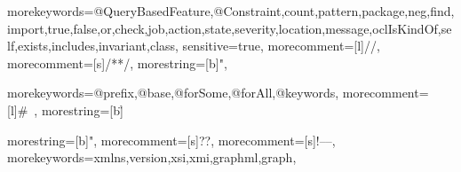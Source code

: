 
{
	morekeywords={@QueryBasedFeature,@Constraint,count,pattern,package,neg,find,import,true,false,or,check,job,action,state,severity,location,message,oclIsKindOf,self,exists,includes,invariant,class},
	sensitive=true,
	morecomment=[l]{//},
	morecomment=[s]{/*}{*/},
	morestring=[b]{"},
}




\newcommand{\listingiqpl}[2]
{
	\lstset{
		language=iqpl
	}
	
}

\newcommand{\listingjava}[2]{
	\lstset{
		language=Java
	}
	
}

\newcommand{\listingsparql}[2]{
	\lstset{
		language=sparql
	}
	
}

{
	morekeywords={@prefix,@base,@forSome,@forAll,@keywords},
	morecomment=[l]{\#\ },
	morestring=[b]\"
}


{
	morestring=[b]",
	morecomment=[s]{?}{?},
	morecomment=[s]{!--}{--},
	morekeywords={xmlns,version,xsi,xmi,graphml,graph},
}

\newcommand{\catchproblem}{\texttt{catchProblemFinder}\xspace}
\newcommand{\handlervar}{\texttt{handlerVariable}\xspace}
\newcommand{\baseindex}{\mbox{EMF-IncQuery} Base Index\xspace}
\newcommand{\screenshotscale}{0.74}
\newcommand{\stackedlines}[2]{\begin{tabular}{@{}c@{}}#1 \\ #2\end{tabular}}
\newcommand{\eobject}{\texttt{EObject}\xspace}

\newcommand{\todo}[1]{\textcolor{red}{\LARGE{TODO: #1}}\xspace}%
\newcommand{\Modeldriven}{Model-driven\xspace}
\newcommand{\modeldriven}{model-driven\xspace}
\newcommand{\matlab}{\textsc{Matlab}\xspace}
\newcommand{\simulink}{\textsc{Simulink}\xspace}
\newcommand{\matlabsimulink}{\textsc{Matlab-Simulink}\xspace}

\newcommand{\functionCall}[1]{\kern-0.25em(#1)}